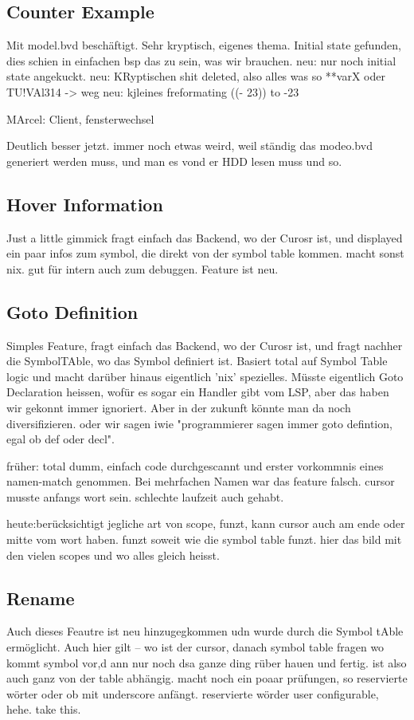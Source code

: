 \subsection{Counter Example}
Mit model.bvd beschäftigt. Sehr kryptisch, eigenes thema.
Initial state gefunden, dies schien in einfachen bsp das zu sein, was wir brauchen.
neu: nur noch initial state angekuckt.
neu: KRyptischen shit deleted, also alles was so **varX  oder TU!VAl314 -> weg
neu: kjleines freformating   ((- 23)) to -23

MArcel: Client, fensterwechsel

Deutlich besser jetzt. immer noch etwas weird, weil ständig das modeo.bvd generiert werden muss, und man es vond er HDD lesen muss und so.


\subsection{Hover Information}
Just a little gimmick
fragt einfach das Backend, wo der Curosr ist, und displayed ein paar infos zum symbol, die direkt von der symbol table kommen.
macht sonst nix.
gut für intern auch zum debuggen.
Feature ist neu.

\subsection{Goto Definition}
Simples Feature, fragt einfach das Backend, wo der Curosr ist, und fragt nachher die SymbolTAble, wo das Symbol definiert ist.
Basiert total auf Symbol Table logic und macht darüber hinaus eigentlich 'nix' spezielles.
Müsste eigentlich Goto Declaration heissen, wofür es sogar ein Handler gibt vom LSP, aber das haben wir gekonnt immer ignoriert. Aber in der zukunft könnte man da noch diversifizieren.
oder wir sagen iwie "programmierer sagen immer goto defintion, egal ob def oder decl".

früher: total dumm, einfach code durchgescannt und erster vorkommnis eines namen-match genommen. Bei mehrfachen Namen war das feature falsch. cursor musste anfangs wort sein.
schlechte laufzeit auch gehabt.

heute:berücksichtigt jegliche art von scope, funzt, kann cursor auch am ende oder mitte vom wort haben. funzt soweit wie die symbol table funzt.
hier das bild mit den vielen scopes und wo alles gleich heisst.


\subsection{Rename}
Auch dieses Feautre ist neu hinzugegkommen udn wurde durch die Symbol tAble ermöglicht.
Auch hier gilt -- wo ist der cursor, danach symbol table fragen wo kommt symbol vor,d ann nur noch dsa ganze ding rüber hauen und fertig.
ist also auch ganz von der table abhängig.
macht noch ein poaar prüfungen, so reservierte wörter oder ob mit underscore anfängt. reservierte wörder user configurable, hehe. take this.

